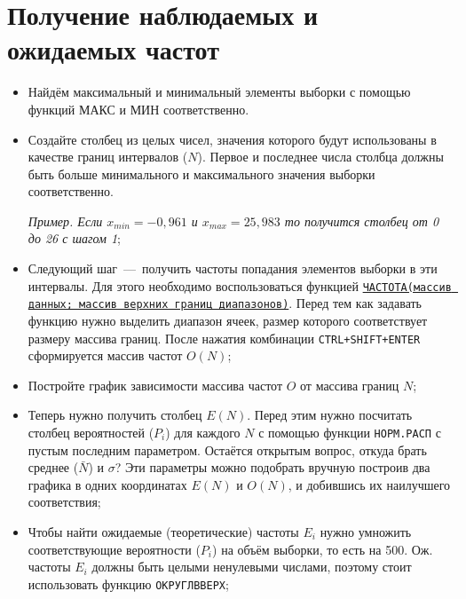 \documentclass[14pt,a4paper]{article}
\begin{document}
\section{Получение наблюдаемых и ожидаемых частот}	
\begin{itemize}
	\item Найдём максимальный и минимальный элементы выборки с помощью функций МАКС и МИН соответственно. 
	\item Создайте столбец из целых чисел, значения которого будут использованы в качестве границ интервалов ($N$). Первое и последнее числа столбца должны быть больше минимального и максимального значения выборки соответственно. 
	
	\textit{Пример. Если $x_{min} = -0,961$ и $x_{max} = 25,983$ то получится столбец от 0 до 26 с шагом 1};

	\item Следующий шаг~---~получить частоты попадания элементов выборки в эти интервалы. Для этого необходимо воспользоваться функцией \href{https://support.microsoft.com/ru-ru/office/%D1%84%D1%83%D0%BD%D0%BA%D1%86%D0%B8%D1%8F-%D1%87%D0%B0%D1%81%D1%82%D0%BE%D1%82%D0%B0-44e3be2b-eca0-42cd-a3f7-fd9ea898fdb9}{\texttt{ЧАСТОТА(массив данных; массив верхних границ диапазонов)}}. Перед тем как задавать функцию нужно выделить диапазон ячеек, размер которого соответствует размеру массива границ. После нажатия комбинации \texttt{CTRL+SHIFT+ENTER} сформируется массив частот $O(N)$;
	\item Постройте график зависимости массива частот $O$ от массива границ $N$;
	\item Теперь нужно получить столбец $E(N)$. Перед этим нужно посчитать столбец вероятностей  ($P_i$) для каждого $N$ с помощью функции \texttt{НОРМ.РАСП} с пустым последним параметром. Остаётся открытым вопрос, откуда брать среднее ($\bar{N}$) и $\sigma$? Эти параметры можно подобрать вручную построив два графика в одних координатах $E(N)$ и $O(N)$, и добившись их наилучшего соответствия;
	\item Чтобы найти ожидаемые (теоретические) частоты $E_i$ нужно умножить соответствующие вероятности ($P_i$) на объём выборки, то есть на 500. Ож. частоты $E_i$ должны быть целыми ненулевыми числами, поэтому стоит использовать функцию \texttt{ОКРУГЛВВЕРХ};
\end{itemize}
\end{document}
